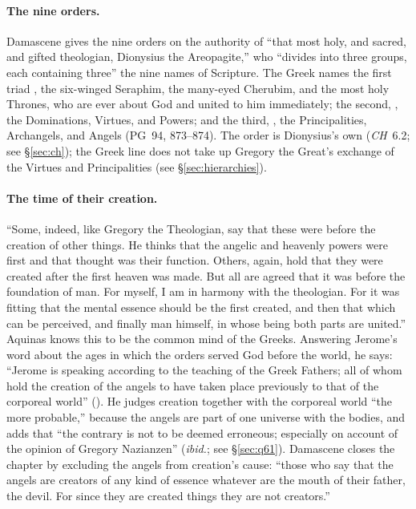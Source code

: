 \paragraph{The nine orders.} Damascene gives the nine orders on the
authority of ``that most holy, and sacred, and gifted theologian, Dionysius
the Areopagite,'' who ``divides into three groups, each containing three''
the nine names of Scripture. The Greek names the first triad , the six-winged Seraphim, the many-eyed Cherubim,
and the most holy Thrones, who are ever about God and united to him
immediately; the second, , the Dominations, Virtues, and Powers; and the third, , the Principalities, Archangels, and
Angels (PG~94, 873--874). The order is Dionysius's own (\emph{CH}~6.2; see
\S\ref{sec:ch}); the Greek line does not take up Gregory the Great's
exchange of the Virtues and Principalities (see \S\ref{sec:hierarchies}).

\paragraph{The time of their creation.} ``Some, indeed, like Gregory the
Theologian, say that these were before the creation of other things. He
thinks that the angelic and heavenly powers were first and that thought was
their function. Others, again, hold that they were created after the first
heaven was made. But all are agreed that it was before the foundation of
man. For myself, I am in harmony with the theologian. For it was fitting
that the mental essence should be the first created, and then that which can
be perceived, and finally man himself, in whose being both parts are
united.'' Aquinas knows this to be the common mind of the Greeks. Answering
Jerome's word about the ages in which the orders served God before the
world, he says: ``Jerome is speaking according to the teaching of the Greek
Fathers; all of whom hold the creation of the angels to have taken place
previously to that of the corporeal world'' (). He
judges creation together with the corporeal world ``the more probable,''
because the angels are part of one universe with the bodies, and adds that
``the contrary is not to be deemed erroneous; especially on account of the
opinion of Gregory Nazianzen'' (\emph{ibid.}; see \S\ref{sec:q61}). Damascene
closes the chapter by excluding the angels from creation's cause: ``those who
say that the angels are creators of any kind of essence whatever are the
mouth of their father, the devil. For since they are created things they
are not creators.''

